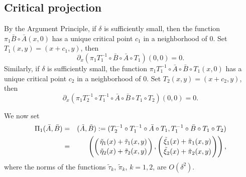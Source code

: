 \subsection{Critical projection} By the Argument Principle, 
if $\delta$ is sufficiently small, then 
the function $\pi_1 \bar B \circ \bar A (x,0)$ has a unique critical point $c_1$ in a neighborhood of $0$. Set $T_1(x,y)=(x+c_1,y)$, then
$$\partial_x \left(\pi_1 T_1^{-1} \circ \bar B \circ \bar A \circ T_1  \right)(0,0)=0.$$ Similarly, if $\delta$ is sufficiently small, the function $\pi_1 T_1^{-1} \circ \bar A \circ \bar B \circ T_1(x,0)$ has a unique critical point $c_2$ in a neighborhood of $0$.  Set $T_2(x,y)=(x+c_2,y)$, then
$$\partial_x \left(\pi_1 T_2^{-1} \circ T_1^{-1} \circ \bar A \circ \bar B \circ T_1  \circ T_2 \right)(0,0)=0.$$

We now set
\begin{eqnarray}
\nonumber \Pi_1(\bar A, \bar B)&=&(\tilde A, \tilde B):=(T_2^{-1} \circ T_1^{-1} \circ \bar A \circ T_1, T^{-1}_1 \circ \bar B \circ T_1 \circ T_2)\\
\nonumber &=& \left( \left( \tilde \eta_1(x) + \tilde \tau_1(x,y) \atop   \tilde \eta_2(x) + \tilde \tau_2(x,y)  \right), \left( \tilde \xi_1(x) + \tilde \pi_1(x,y) \atop   \tilde \xi_2(x) + \tilde \pi_2(x,y)  \right)   \right),
\end{eqnarray}
where the norms of the functions $\tilde \tau_k$, $\tilde \pi_k$, $k=1,2$, are $O(\delta^2)$. 

